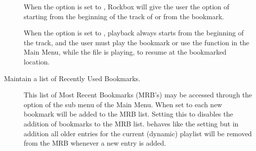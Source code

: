 \begin{description}
  When the  option is set to , Rockbox will
  give the user the option of starting from the beginning of the track
  of or from the bookmark. 

  When the  option is set to , playback always
  starts from the beginning of the track, and the user must play the bookmark
  or use the  function in the Main Menu, while the file
  is playing, to resume at the bookmarked location.
    
  \item [Maintain a list of Recently Used Bookmarks. ]

  This list of Most Recent Bookmarks (MRB's) may be accessed through the
   option of the  sub menu of the 
  Main Menu. When set to  each new bookmark will be added to the
  MRB list. Setting this to  disables the addition of bookmarks to
  the MRB list.  behaves like the  setting 
  but in addition all older entries for the current (dynamic) playlist will 
  be removed from the MRB whenever a new entry is added.
  \end{description}
